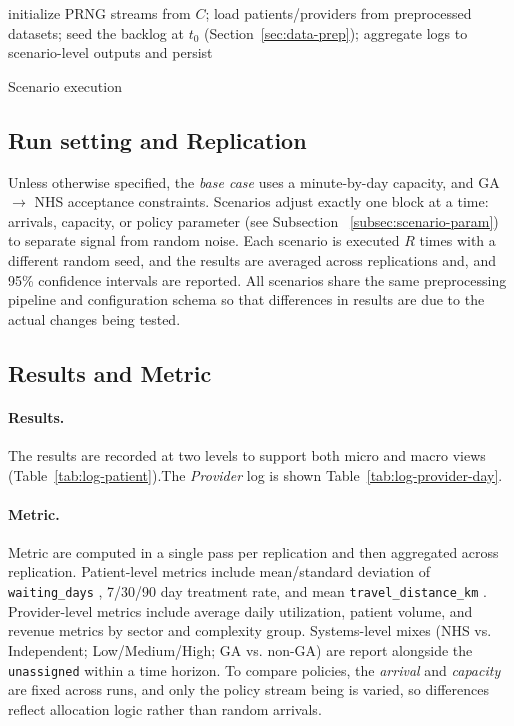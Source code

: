 \documentclass[ %
                    author={Nattanan Nawakitbamrung},
                supervisor={Dr. Sébastien Rochat},
                    degree={MSc},
                     title={Developing and Evaluating the Impact of a Single Patient Treatment List (PTL) for an NHS Integrated Care System},
                  subtitle={},
                      type={},
                      year={2025}]{dissertation}
\begin{document}
\begin{algorithm}[htbp]
initialize PRNG streams from $C$;\;
load patients/providers from preprocessed datasets;\;
seed the backlog at $t_0$ (Section~\ref{sec:data-prep});\;
aggregate logs to scenario-level outputs and persist
\caption{Scenario execution}
\label{alg:runner}
\end{algorithm}

\subsection{Run setting and Replication}
Unless otherwise specified, the \textit{base case} uses a minute-by-day capacity, and GA$\rightarrow$ NHS acceptance constraints. Scenarios adjust exactly one block at a time: arrivals, capacity, or policy parameter (see Subsection ~\ref{subsec:scenario-param}) to separate signal from random noise. Each scenario is executed \(R\) times with a different random seed, and the results are averaged across replications and, and 95\% confidence intervals are reported. All scenarios share the same preprocessing pipeline and configuration schema so that differences in results are due to the actual changes being tested.

\subsection{Results and Metric}
\paragraph{Results.} The results are recorded at two levels to support both micro and macro views (Table~\ref{tab:log-patient}).The \textit{Provider} log is shown Table~\ref{tab:log-provider-day}. 

\paragraph{Metric.} Metric are computed in a single pass per replication and then aggregated across replication. Patient-level metrics include mean/standard deviation of \texttt{waiting\_days} , 7/30/90 day treatment rate, and mean \texttt{travel\_distance\_km} . Provider-level metrics include average daily utilization, patient volume, and revenue metrics by sector and complexity group. Systems-level mixes (NHS vs. Independent; Low/Medium/High; GA vs. non-GA) are report alongside the \texttt{unassigned} within a time horizon. To compare policies, the \textit{arrival} and \textit{capacity} are fixed across runs, and only the policy stream being is varied, so differences reflect allocation logic rather than random arrivals.
\end{document}
